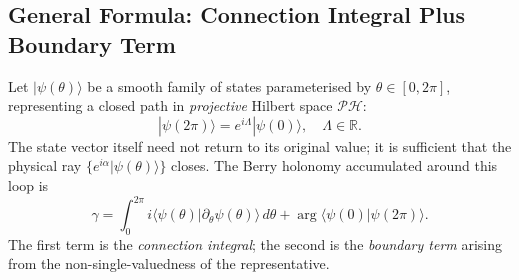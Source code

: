 \documentclass[%
 reprint,
 amsmath,amssymb,
 aps,
 prb,
]{revtex4-2}
\numberwithin{equation}{section}
\theoremstyle{definition}
\theoremstyle{remark}
\begin{document}
\subsection{General Formula: Connection Integral Plus Boundary Term}

Let $|\psi(\theta)\rangle$ be a smooth family of states parameterised by $\theta \in [0, 2\pi]$, representing a closed path in \emph{projective} Hilbert space $\mathcal{P}\mathcal{H}$:
\begin{equation}
|\psi(2\pi)\rangle = e^{i\Lambda}|\psi(0)\rangle,
\quad \Lambda \in \mathbb{R}.
\label{eq:bc_general}
\end{equation}
The state vector itself need not return to its original value; it is sufficient that the physical ray $\{e^{i\alpha}|\psi(\theta)\rangle\}$ closes.  The Berry holonomy accumulated around this loop is
\begin{equation}
\gamma
= \int_0^{2\pi} i\langle\psi(\theta)|\partial_\theta\psi(\theta)\rangle\,d\theta
  + \arg\langle\psi(0)|\psi(2\pi)\rangle.
\label{eq:berry_general}
\end{equation}
The first term is the \emph{connection integral}; the second is the \emph{boundary term} arising from the non-single-valuedness of the representative.
\end{document}
